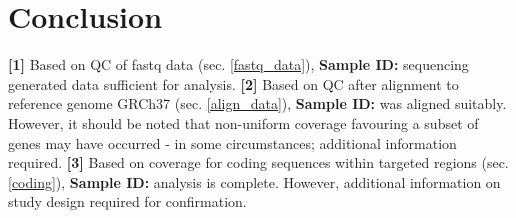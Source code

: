 \documentclass{article}
\begin{document}
\section{Conclusion}
\label{conclusion}
\textbf{[1]} Based on QC of fastq data (sec. \ref{fastq_data}), 
\textbf{Sample ID: {\color{kispired}\SampleID}}
sequencing generated data sufficient for analysis.
\textbf{[2]} Based on QC after alignment to reference genome GRCh37 (sec. \ref{align_data}), 
\textbf{Sample ID: {\color{kispired}\SampleID}} was aligned suitably.
However, it should be noted that non-uniform coverage favouring a subset of genes may have occurred -  in some circumstances;  additional information required.
\textbf{[3]} Based on coverage for coding sequences within targeted regions (sec. \ref{coding}), \textbf{Sample ID: {\color{kispired}\SampleID}} analysis is complete.
However, additional information on study design required for confirmation.




\end{document}
